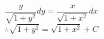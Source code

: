 \item

\[
	\frac{y}{\sqrt{1 + y^2}} dy = \frac{x}{\sqrt{1 + x^2}} dx
\]
\[
	\therefore \sqrt{1 + y^2} = \sqrt{1 + x^2} + C
\]
